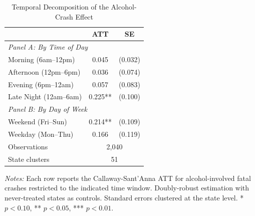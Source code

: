 \begin{table}[t]
\centering
\caption{Temporal Decomposition of the Alcohol-Crash Effect}
\label{tab:temporal}
\begin{tabular}{lcc}
\toprule
 & ATT & SE \\
\midrule
\multicolumn{3}{l}{\textit{Panel A: By Time of Day}} \\
Morning (6am--12pm) & 0.045 & (0.032) \\
Afternoon (12pm--6pm) & 0.036 & (0.074) \\
Evening (6pm--12am) & 0.057 & (0.083) \\
Late Night (12am--6am) & 0.225** & (0.100) \\
\midrule
\multicolumn{3}{l}{\textit{Panel B: By Day of Week}} \\
Weekend (Fri--Sun) & 0.214** & (0.109) \\
Weekday (Mon--Thu) & 0.166 & (0.119) \\
\midrule
Observations & \multicolumn{2}{c}{2,040} \\
State clusters & \multicolumn{2}{c}{51} \\
\bottomrule
\end{tabular}
\begin{tablenotes}
\small
\item \textit{Notes:} Each row reports the Callaway-Sant'Anna ATT for alcohol-involved fatal crashes restricted to the indicated time window. Doubly-robust estimation with never-treated states as controls. Standard errors clustered at the state level. * $p<0.10$, ** $p<0.05$, *** $p<0.01$.
\end{tablenotes}
\end{table}
